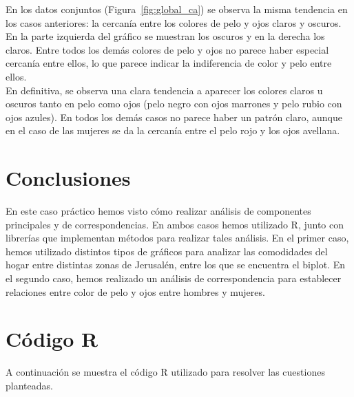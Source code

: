 \documentclass[12pt,a4paper,twoside,openright,titlepage,final]{article}
\begin{document}
En los datos conjuntos (Figura~\ref{fig:global_ca}) se observa la misma tendencia en los casos anteriores: la cercanía entre los colores de pelo y ojos claros y oscuros. En la parte izquierda del gráfico se muestran los oscuros y en la derecha los claros. Entre todos los demás colores de pelo y ojos no parece haber especial cercanía entre ellos, lo que parece indicar la indiferencia de color y pelo entre ellos.\\

En definitiva, se observa una clara tendencia a aparecer los colores claros u oscuros tanto en pelo como ojos (pelo negro con ojos marrones y pelo rubio con ojos azules). En todos los demás casos no parece haber un patrón claro, aunque en el caso de las mujeres se da la cercanía entre el pelo rojo y los ojos avellana. 

\section{Conclusiones}

En este caso práctico hemos visto cómo realizar análisis de componentes principales y de correspondencias. En ambos casos hemos utilizado R, junto con librerías que implementan métodos para realizar tales análisis. En el primer caso, hemos utilizado distintos tipos de gráficos para analizar las comodidades del hogar entre distintas zonas de Jerusalén, entre los que se encuentra el biplot. En el segundo caso, hemos realizado un análisis de correspondencia para establecer relaciones entre color de pelo y ojos entre hombres y mujeres. 

\clearpage

\section{Código R}

A continuación se muestra el código R utilizado para resolver las cuestiones planteadas.


\end{document}
